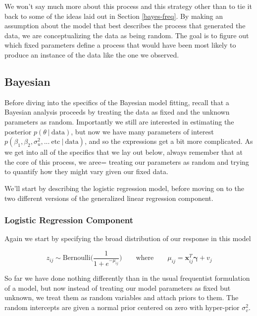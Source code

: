 \documentclass[12pt,twoside]{reedthesis}
\begin{document}
We won't say much more about this process and this strategy other than to tie it back to some of the ideas laid out in Section \ref{bayes-freq}. By making an assumption about the model that best describes the process that generated the data, we are conceptualizing the data as being random. The goal is to figure out which fixed parameters define a process that would have been most likely to produce an instance of the data like the one we observed.

\hypertarget{bayesian}{%
\subsection{Bayesian}\label{bayesian}}

Before diving into the specifics of the Bayesian model fitting, recall that a Bayesian analysis proceeds by treating the data as fixed and the unknown parameters as random. Importantly we still are interested in estimating the posterior \(p(\theta \ | \ \text{data})\), but now we have many parameters of interest \(p(\beta_1, \beta_2, \sigma^2_{u}, ... \ \text{etc} \ | \ \text{data})\), and so the expressions get a bit more complicated. As we get into all of the specifics that we lay out below, always remember that at the core of this process, we aree= treating our parameters as random and trying to quantify how they might vary given our fixed data.

We'll start by describing the logistic regression model, before moving on to the two different versions of the generalized linear regression component.

\hypertarget{logistic-regression-component}{%
\subsubsection{Logistic Regression Component}\label{logistic-regression-component}}

Again we start by specifying the broad distribution of our response in this model

\[
z_{ij} \sim \text{Bernoulli}\Bigg(\frac{1}{1 + e^{-\mu_{ij}}}\Bigg) \qquad \text{where} \qquad \mu_{ij} =\mathbf{x}_{ij}^T\boldsymbol{\gamma} + v_j
\]

So far we have done nothing differently than in the usual frequentist formulation of a model, but now instead of treating our model parameters as fixed but unknown, we treat them as random variables and attach priors to them. The random intercepts are given a normal prior centered on zero with hyper-prior \(\sigma_v^2\).
\end{document}
